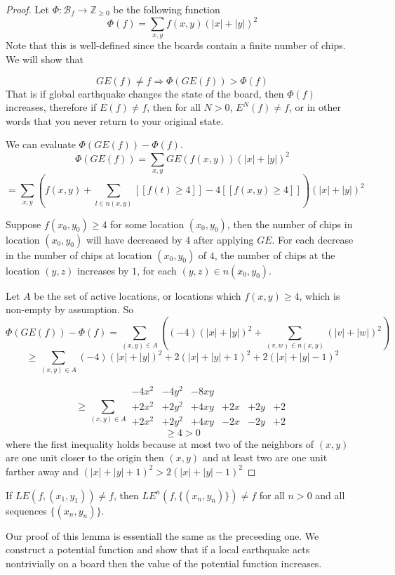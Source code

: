 \documentclass[runningheads,a4paper]{llncs}
\begin{document}
\begin{proof}
Let $\Phi: \mathcal{B}_f \rightarrow \mathbb{Z}_{\geq 0}$ be the following function
\[ \Phi(f) = \sum_{x,y} f(x,y)(|x|+|y|)^2 \]
Note that this is well-defined since the boards contain a finite number of chips. We will show that 

\[ GE(f) \neq f \Rightarrow \Phi(GE(f)) > \Phi(f) \]
That is if global earthquake changes the state of the board, then $\Phi(f)$ increases, therefore if $E(f) \neq f$, then for all $N > 0$, $E^N(f) \neq f$, or in other words that you never return to your original state.

We can evaluate $\Phi(GE(f)) - \Phi(f)$.
\[ \Phi(GE(f)) = \sum_{x,y} GE(f(x,y)) (|x|+|y|)^2 \]
\[ = \sum_{x,y} \left(f(x,y) + \sum_{l \in n(x,y)} [[f(t) \geq 4]] - 4[[f(x,y) \geq 4]]\right) (|x|+|y|)^2 \]

Suppose $f(x_0,y_0) \geq 4$ for some location $(x_0, y_0)$, then the number of chips in location $(x_0,y_0)$ will have decreased by $4$ after applying $GE$. 
For each decrease in the number of chips at location $(x_0,y_0)$ of $4$, the number of chips at the location $(y,z)$ increases by $1$, for each $(y,z) \in n(x_0,y_0)$.

Let $A$ be the set of active locations, or locations which $f(x,y) \geq 4$, which is non-empty by assumption. 
So
\[ \Phi(GE(f)) - \Phi(f) = \sum_{(x,y) \in A} \left((-4)(|x|+|y|)^2 + \sum_{(v,w) \in n(x,y)} (|v| + |w|)^2 \right) \]
\[\geq \sum_{(x,y) \in A} (-4)(|x|+|y|)^2 + 2(|x|+|y|+1)^2 + 2(|x|+|y|-1)^2 \]

\[ \geq \sum_{(x,y) \in A} \begin{array}{cccccc} -4x^2 & -4y^2 & -8xy & & &\\
									   +2x^2 & +2y^2 & +4xy & +2x& +2y &+ 2\\
									   +2x^2 & +2y^2 & +4xy & -2x& -2y  & +2 \end{array} \]
\[ \geq 4 > 0 \] 
where the first inequality holds because at most two of the neighbors of $(x,y)$ are one unit closer to the origin then $(x,y)$ and at least two are one unit farther away and $(|x|+|y|+1)^2 > 2(|x|+|y|-1)^2$
\end{proof}

\begin{lemma}
If $LE(f, (x_1, y_1)) \neq f$, then $LE^n(f, \{(x_n,y_n)\}) \neq f$ for all $n > 0$ and all sequences $\{(x_n, y_n)\}$.
\end{lemma}
Our proof of this lemma is essentiall the same as the preceeding one. We construct a potential function and show that if a local earthquake acts nontrivially on a board then the value of the potential function increases. 
\end{document}
